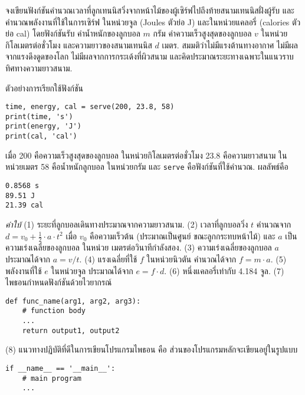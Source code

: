 \begin{Exercise}
	\label{prog: assignment tennis}

จงเขียนฟังก์ชันคำนวณเวลาที่ลูกเทนนิสวิ่งจากหน้าไม้ของผู้เซิร์ฟไปถึงท้ายสนามเทนนิสฝั่งผู้รับ
และคำนวณพลังงานที่ใช้ในการเซิร์ฟ ในหน่วยจูล (Joules ตัวย่อ J) 
และในหน่วยแคลอรี่ (calories ตัวย่อ cal)
โดยฟังก์ชันรับ
ค่าน้ำหนักของลูกบอล $m$ กรัม
ค่าความเร็วสูงสุดของลูกบอล $v$ ในหน่วยกิโลเมตรต่อชั่วโมง
และความยาวของสนามเทนนิส $d$ เมตร.
สมมติว่าไม่มีแรงต้านทางอากาศ
ไม่มีผลจากแรงดึงดูดของโลก
ไม่มีผลจากการกระเด้งที่ผิวสนาม
และคิดประมาณระยะทางเฉพาะในแนวราบทิศทางความยาวสนาม.

ตัวอย่างการเรียกใช้ฟังก์ชัน
\begin{verbatim}
time, energy, cal = serve(200, 23.8, 58)
print(time, 's')
print(energy, 'J')
print(cal, 'cal')
\end{verbatim}
เมื่อ 200 คือความเร็วสูงสุดของลูกบอล ในหน่วยกิโลเมตรต่อชั่วโมง
23.8 คือความยาวสนาม ในหน่วยเมตร
58 คือน้ำหนักลูกบอล ในหน่วยกรัม
และ \verb|serve| คือฟังก์ชันที่ใช้คำนวณ.
ผลลัพธ์คือ
\begin{verbatim}
0.8568 s
89.51 J
21.39 cal
\end{verbatim}

\textit{คำใบ้}
(1) ระยะที่ลูกบอลเดินทางประมาณจากความยาวสนาม.
(2)
เวลาที่ลูกบอลวิ่ง $t$ คำนวณจาก
$d = v_0 + \frac{1}{2} \cdot a \cdot t^2$ 
เมื่อ $v_0$ คือความเร็วต้น (ประมาณเป็นศูนย์ ขณะลูกกระทบหน้าไม้)
และ $a$ เป็นความเร่งเฉลี่ยของลูกบอล ในหน่วย เมตรต่อวินาทีกำลังสอง.
(3) ความเร่งเฉลี่ยของลูกบอล $a$ ประมาณได้จาก $a = v/t$.
(4) แรงเฉลี่ยที่ใช้ $f$ ในหน่วยนิวตัน คำนวณได้จาก $f = m \cdot a$.
(5) พลังงานที่ใช้ $e$ ในหน่วยจูล ประมาณได้จาก $e = f \cdot d$.
(6) หนึ่งแคลอรี่เท่ากับ 4.184 จูล.
(7) ไพธอนกำหนดฟังก์ชันด้วยไวยากรณ์
\begin{verbatim}
def func_name(arg1, arg2, arg3):
    # function body
    ...
    return output1, output2
\end{verbatim}
(8)
แนวทางปฏิบัติที่ดีในการเขียนโปรแกรมไพธอน คือ ส่วนของโปรแกรมหลักจะเขียนอยู่ในรูปแบบ
\begin{verbatim}
if __name__ == '__main__':
    # main program
    ...
\end{verbatim}

\end{Exercise}

